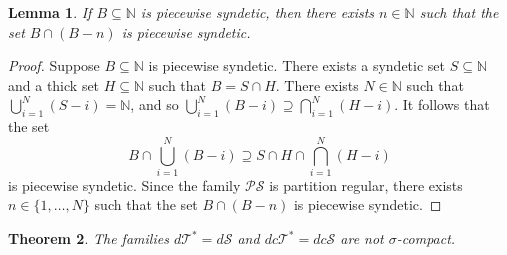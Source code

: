 \documentclass[letter,11pt]{article}
\theoremstyle{plain}
\newtheorem{theorem}{Theorem}
\newtheorem{lemma}[theorem]{Lemma}
\theoremstyle{definition}
\theoremstyle{plain}
\theoremstyle{plain}
\numberwithin{equation}{section}
\newcommand{\N}{\mathbb{N}}
\newcommand{\dsyndetic}{d\mathcal{S}}
\newcommand{\dthick}{d\mathcal{T}}
\newcommand{\dcsyndetic}{dc\mathcal{S}}
\newcommand{\dcthick}{dc\mathcal{T}}
\newcommand{\PS}{\mathcal{PS}}
\begin{document}
\begin{lemma}
\label{lem:piecewise_syndetic_shift}
    If $B \subseteq \N$ is piecewise syndetic, then there exists $n \in \N$ such that the set $B \cap (B - n)$ is piecewise syndetic.
\end{lemma}

\begin{proof}
    Suppose $B \subseteq \N$ is piecewise syndetic. There exists a syndetic set $S \subseteq \N$ and a thick set $H \subseteq \N$ such that $B = S \cap H$.  There exists $N \in \N$ such that $\bigcup_{i=1}^N (S-i) = \N$, and so $\bigcup_{i=1}^N (B-i) \supseteq \bigcap_{i=1}^N (H-i)$. It follows that the set 
    \[
        B \cap \bigcup_{i=1}^N (B-i) \supseteq S \cap H \cap \bigcap_{i=1}^N (H-i)
    \]
    is piecewise syndetic.  Since the family $\PS$ is partition regular, there exists $n \in \{1, \ldots, N\}$ such that the set $B \cap (B-n)$ is piecewise syndetic.
\end{proof}

\begin{theorem}
\label{theorem_dy_syndetic_is_not_sigma_compact}
    The families $\dthick^* = \dsyndetic$ and $\dcthick^* = \dcsyndetic$ are not $\sigma$-compact.
\end{theorem}
\end{document}
